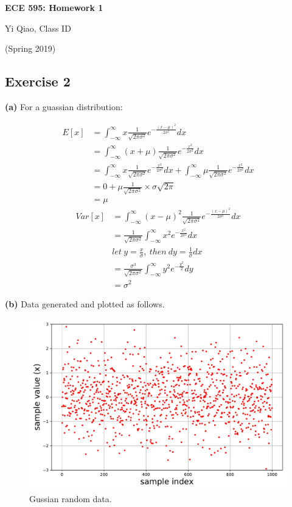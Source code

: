 \documentclass[11pt]{article}
\begin{document}
\begin{center}
\Large{\textbf{ECE 595: Homework 1}}

Yi Qiao, Class ID

(Spring 2019)
\end{center}


\subsection*{Exercise 2}
\noindent\textbf{(a)} For a guassian distribution:

\begin{equation} \label{eq1}
\begin{split}
E[x] &=\int_{-\infty}^{\infty}x\frac{1}{\sqrt{2\pi\sigma^2}}e^{-\frac{(x-\mu)^2}{2\sigma^2}}dx \\
	&=\int_{-\infty}^{\infty}(x+\mu)\frac{1}{\sqrt{2\pi\sigma^2}}e^{-\frac{x^2}{2\sigma^2}}dx \\
	&=\int_{-\infty}^{\infty}x\frac{1}{\sqrt{2\pi\sigma^2}}e^{-\frac{x^2}{2\sigma^2}}dx+\int_{-\infty}^{\infty}\mu\frac{1}{\sqrt{2\pi\sigma^2}}e^{-\frac{x^2}{2\sigma^2}}dx \\
	&=0+\mu\frac{1}{\sqrt{2\pi\sigma^2}}\times\sigma\sqrt{2\pi} \\
	&=\mu
\end{split}
\end{equation}
\begin{equation} \label{eq2}
\begin{split}
Var[x] &=\int_{-\infty}^{\infty}(x-\mu)^2\frac{1}{\sqrt{2\pi\sigma^2}}e^{-\frac{(x-\mu)^2}{2\sigma^2}}dx \\
	&=\frac{1}{\sqrt{2\pi\sigma^2}}\int_{-\infty}^{\infty}x^2e^{-\frac{x^2}{2\sigma^2}}dx \\
	&let\ y = \frac{x}{\sigma},\ then\ dy=\frac{1}{\sigma}dx \\
	&=\frac{\sigma^3}{\sqrt{2\pi\sigma^2}}\int_{-\infty}^{\infty}y^2e^{-\frac{y^2}{2}}dy \\
	&=\sigma^2
\end{split}
\end{equation}

\noindent\textbf{(b)} Data generated and plotted as follows.
\begin{figure}[h]
\centering
\includegraphics[width=0.5\linewidth]{exercise2_b}
\caption{Gussian random data.}
\label{fig: figure 1}
\end{figure}
\pagebreak
\end{document}

